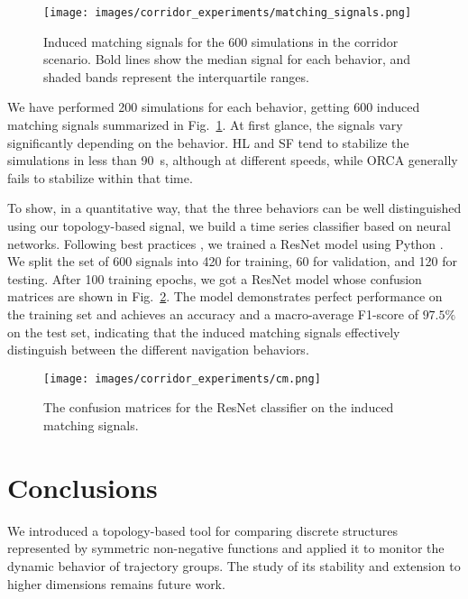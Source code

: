 \documentclass{article}
\begin{document}
\begin{figure}[ht!]
\centering
\texttt{[image: images/corridor\_experiments/matching\_signals.png]}
\caption{Induced matching signals for the 600 simulations in the corridor scenario. Bold lines show the median signal for each behavior, and shaded bands represent the interquartile ranges.}
\label{fig:corridor-matching-signals}
\end{figure}

We have performed 200 simulations for each behavior, getting 600 induced matching signals summarized in Fig.~\ref{fig:corridor-matching-signals}. At first glance, the signals vary significantly depending on the behavior. HL and SF tend to stabilize the simulations in less than \SI{90}{\second}, although at different speeds, while ORCA generally fails to stabilize 
within that time. 

To show, in a quantitative way, that the three behaviors can be well distinguished using our topology-based signal, we build a time series classifier based on neural networks.
Following best practices  \cite{ismail2019deep}, we trained a ResNet model \cite{wang2017time} using Python \cite[Chapter~8]{cerqueira2024deep}. 
We split the set of 600 signals into 420 for training, 60 for validation, and 120 for testing. After 100 training epochs, we got a ResNet model whose confusion matrices are shown in Fig.~\ref{fig:corridor-cm}. The model demonstrates perfect performance on the training set and achieves an accuracy and a macro-average F1-score of $97.5\%$ on the test set, indicating that the induced matching signals effectively distinguish between the different navigation behaviors.

\begin{figure}[ht!]
\centering
\texttt{[image: images/corridor\_experiments/cm.png]}
\caption{The confusion matrices for the ResNet classifier on the induced matching signals.}
\label{fig:corridor-cm}
\end{figure}

\section{Conclusions}

We introduced a topology-based tool for comparing discrete structures represented by symmetric non-negative functions and applied it to monitor the dynamic behavior of trajectory groups.
The study of its stability and extension to higher dimensions remains future work.
\end{document}
